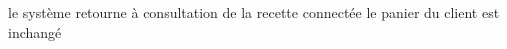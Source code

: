 \exception 
{} 
  \etape le système retourne à consultation de la recette connectée
\stopcondition
\postcondition le panier du client est inchangé
\stopalternatif
\stopCU
